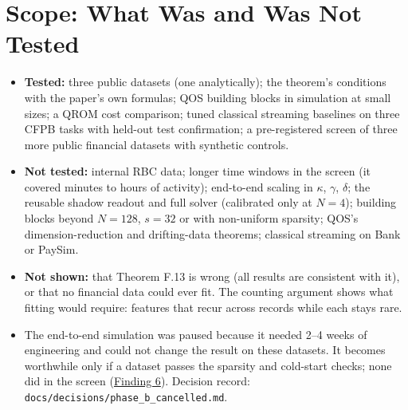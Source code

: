 \documentclass[10pt]{article}
\newenvironment{sectionblock}
{%
    \par
    \vspace{2pt}
    \noindent
    \begin{minipage}{\textwidth}
}
{%
    \end{minipage}
    \par
    \vspace{5pt}
}
\begin{document}
\begin{sectionblock}

\section{Scope: What Was and Was Not Tested}
\label{sec:scope}

\begin{itemize}
    \item \textbf{Tested:} three public datasets (one analytically); the theorem's conditions with the paper's own formulas; QOS building blocks in simulation at small sizes; a QROM cost comparison; tuned classical streaming baselines on three CFPB tasks with held-out test confirmation; a pre-registered screen of three more public financial datasets with synthetic controls.
    \item \textbf{Not tested:} internal RBC data; longer time windows in the screen (it covered minutes to hours of activity); end-to-end scaling in $\kappa$, $\gamma$, $\delta$; the reusable shadow readout and full solver (calibrated only at $N=4$); building blocks beyond $N=128$, $s=32$ or with non-uniform sparsity; QOS's dimension-reduction and drifting-data theorems; classical streaming on Bank or PaySim.
    \item \textbf{Not shown:} that Theorem F.13 is wrong (all results are consistent with it), or that no financial data could ever fit. The counting argument shows what fitting would require: features that recur across records while each stays rare.
    \item The end-to-end simulation was paused because it needed 2--4 weeks of engineering and could not change the result on these datasets. It becomes worthwhile only if a dataset passes the sparsity and cold-start checks; none did in the screen (\hyperref[sec:f6]{Finding 6}). Decision record: \texttt{docs/decisions/phase\_b\_cancelled.md}.
\end{itemize}

\end{sectionblock}
\end{document}
